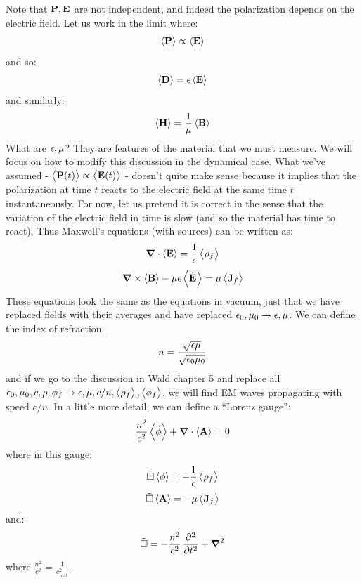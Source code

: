Note that $\mathbf{P}, \mathbf{E}$ are not independent, and indeed the polarization depends on the electric field. Let us work in the limit where:
\begin{equation}
    \left< \mathbf{P} \right> \propto \left< \mathbf{E} \right>
\end{equation}
and so:
\begin{equation}
    \left< \mathbf{D} \right> = \epsilon \left< \mathbf{E} \right>
\end{equation}
and similarly:
\begin{equation}
    \left< \mathbf{H} \right> = \frac{1}{\mu}\left< \mathbf{B} \right>
\end{equation}
What are $\epsilon, \mu$? They are features of the material that we must measure. We will focus on how to modify this discussion in the dynamical case. What we've assumed - $\left< \mathbf{P}(t) \right> \propto \left< \mathbf{E}(t) \right>$ - doesn't quite make sense because it implies that the polarization at time $t$ reacts to the electric field at the same time $t$ instantaneously. For now, let us pretend it is correct in the sense that the variation of the electric field in time is slow (and so the material has time to react). Thus Maxwell's equations (with sources) can be written as:
\begin{equation}
    \nabla \cdot \avg{\v{E}} = \frac{1}{\e}\avg{\rho_f}
\end{equation}
\begin{equation}
    \nabla \times \avg{\v{B}} - \mu \e \avg{\dot{\v{E}}} = \mu\avg{\v{J}_f}
\end{equation}
These equations look the same as the equations in vacuum, just that we have replaced fields with their averages and have replaced $\epsilon_0, \mu_0 \to \epsilon, \mu$. We can define the index of refraction:
\begin{equation}
    n = \frac{\sqrt{\epsilon\mu}}{\sqrt{\epsilon_0\mu_0}}
\end{equation}
and if we go to the discussion in Wald chapter 5 and replace all $\epsilon_0, \mu_0, c, \rho, \phi_f \to \epsilon, \mu, c/n, \left< \rho_f \right>, \left< \phi_f \right>$, we will find EM waves propagating with speed $c/n$. In a little more detail, we can define a ``Lorenz gauge'':
\begin{equation}
    \frac{n^2}{c^2}\avg{\dot{\phi}} + \nabla \cdot \avg{\v{A}} = 0
\end{equation}
where in this gauge:
\begin{equation}
    \tilde{\square}\left< \phi \right> = -\frac{1}{c}\left< \rho_f \right>
\end{equation}
\begin{equation}
    \tilde{\square}\left< \mathbf{A} \right> = -\mu\left< \mathbf{J}_f \right>
\end{equation}
and:
\begin{equation}
    \tilde{\square} = -\frac{n^2}{c^2}\dpd[2]{}{t} + \nabla^2
\end{equation}
where $\frac{n^2}{c^2} = \frac{1}{c_{\text{mat}}^2}$.

